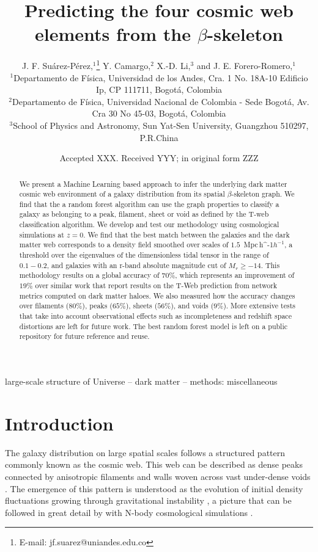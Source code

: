 \documentclass[usenatbib]{mnras}
\title[Cosmic web elements and the $\beta$-skeleton]{Predicting the four cosmic web
  elements from the $\beta$-skeleton}
\author[J. F. Su\'arez-P\'erez et al.]{
J. F. Su\'arez-P\'erez,$^{1}$\thanks{E-mail: jf.suarez@uniandes.edu.co}
Y. Camargo,$^{2}$ 
X.-D. Li,$^{3}$
and J. E. Forero-Romero,$^{1}$
\\
$^{1}$Departamento de F\'isica, Universidad de los Andes, Cra. 1
No. 18A-10 Edificio Ip, CP 111711, Bogot\'a, Colombia\\ 
$^{2}$Departamento de F\'isica, Universidad Nacional de Colombia -
Sede Bogot\'a, Av. Cra 30 No 45-03, Bogot\'a, Colombia\\ 
$^{3}$School of Physics and Astronomy, Sun Yat-Sen University,
Guangzhou 510297, P.R.China\\ 
}
\date{Accepted XXX. Received YYY; in original form ZZZ}
\newcommand{\Mpch}{\,{\rm Mpc}\,\ifmmode h^{-1}\else $h^{-1}$\fi}
\begin{document}
\label{firstpage}
\pagerange{\pageref{firstpage}--\pageref{lastpage}}
\maketitle

\begin{abstract}
We present a Machine Learning based approach to infer the underlying dark matter cosmic web environment of a galaxy distribution from its spatial $\beta$-skeleton graph.
We find that the a random forest algorithm can use the graph properties to classify a galaxy as belonging to a peak, filament, sheet or void as defined by the T-web classification algorithm.
We develop and test our methodology using cosmological simulations at $z=0$.
We find that the best match between the galaxies and the dark matter web corresponds to a density field smoothed over scales of $1.5$ \Mpch, a threshold over the eigenvalues of the dimensionless tidal tensor in the range of $0.1-0.2$, and galaxies with an r-band absolute magnitude cut of $M_r\geq-14$.
This methodology results on a global accuracy of $70\%$, which represents an improvement of $19\%$ over similar work that report results on the T-Web prediction from network metrics computed on dark matter haloes.
We also measured how the accuracy changes over filaments ($80\%$), peaks ($65\%$), sheets ($56\%$), and voids ($9\%$).
More extensive tests that take into account observational effects such as incompleteness and redshift space distortions are left for future work.
The best random forest model is left on a public repository for future reference and reuse. 
\end{abstract}

\begin{keywords}
large-scale structure of Universe -- dark matter -- methods: miscellaneous
\end{keywords}


\section{Introduction}
The galaxy distribution on large spatial scales follows a structured 
pattern commonly known as the cosmic web. 
This web can be described as dense peaks connected by anisotropic
filaments and walls woven across vast under-dense voids 
\citep{Bond1996}.  
The emergence of this pattern is understood as the evolution of
initial density fluctuations growing through gravitational instability
\citep{ZelDovich1970,White1987}, a picture that can be followed in
great detail by with N-body cosmological simulations
\citep{Schmalzing1999,Vogelsberger2014}.     
\end{document}

